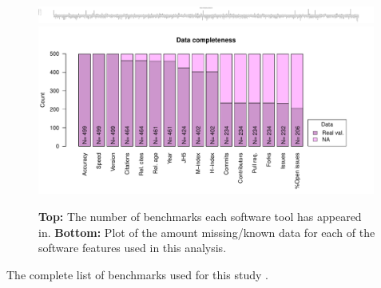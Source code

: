 \documentclass[fleqn,10pt]{SelfArx} %
\begin{document}

\clearpage
\newpage

\begin{figure}[H]
\centering
\includegraphics[width=0.99\textwidth]{numberBenchmarksPerToolBarplot.pdf}\\
\includegraphics[width=0.99\textwidth]{numberRealValueFeaturesBarplot.pdf}
\caption{ {\bf Top:} The number of benchmarks each software tool has appeared in. {\bf Bottom:}
  Plot of the amount missing/known data for each of the software features used in this analysis. 
 }
\label{fig:numBenchmarks}
\end{figure}



\clearpage
\newpage


The complete list of benchmarks used for this study
\cite{pmid32183840,
pmid32138645,
pmid31948481,
pmid31874603,
pmid31984131,
pmid31639029,
pmid31465436,
pmid31324872,
pmid31159850,
pmid31136576,
pmid31080946,
pmid31015787,
pmid30936559,
pmid30717772,
pmid30658573,
pmid29568413,
pmid28934964,
pmid28808243,
pmid28739658,
pmid28569140,
pmid28052134,
pmid27256311,
pmid26862001,
pmid26778510,
pmid26628557,
pmid26220471,
pmid25777524,
pmid25760244,
pmid25574120,
pmid25521762,
pmid25511303,
pmid25198770,
pmid24839440,
pmid24708189,
pmid24602402,
pmid24526711,
pmid24086547,
pmid23842808,
pmid23758764,
pmid23593445,
pmid23393030,
pmid22574964,
pmid22506536,
pmid22492192,
pmid22287634,
pmid22152123,
pmid22172045,
pmid22132132,
pmid21856737,
pmid21615913,
pmid21525877,
pmid21483869,
pmid21423806,
pmid21113338,
pmid20617200,
pmid20047664,
pmid19179695,
pmid19126200,
pmid19046431,
pmid18793413,
pmid18287116,
pmid17151342,
pmid17062146,
pmid15840834,
pmid15701525,
ng2013estimating}.




\end{document}
